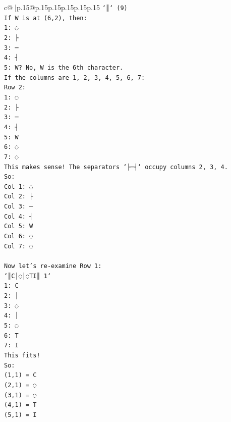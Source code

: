 \documentclass{article}
\begin{document}
{\begin{supertabular}{c@{$\;$}|p{.15\linewidth}@{}p{.15\linewidth}p{.15\linewidth}p{.15\linewidth}p{.15\linewidth}p{.15\linewidth}}
{{{\texttt{`║` (9)} \\
\texttt{If W is at (6,2), then:} \\
\texttt{1: ◌} \\
\texttt{2: ├} \\
\texttt{3: ─} \\
\texttt{4: ┤} \\
\texttt{5: W? No, W is the 6th character.} \\
\texttt{If the columns are 1, 2, 3, 4, 5, 6, 7:} \\
\texttt{Row 2:} \\
\texttt{1: ◌} \\
\texttt{2: ├} \\
\texttt{3: ─} \\
\texttt{4: ┤} \\
\texttt{5: W} \\
\texttt{6: ◌} \\
\texttt{7: ◌} \\
\texttt{This makes sense! The separators `├─┤` occupy columns 2, 3, 4.} \\
\texttt{So:} \\
\texttt{Col 1: ◌} \\
\texttt{Col 2: ├} \\
\texttt{Col 3: ─} \\
\texttt{Col 4: ┤} \\
\texttt{Col 5: W} \\
\texttt{Col 6: ◌} \\
\texttt{Col 7: ◌} \\
\\ 
\texttt{Now let's re{-}examine Row 1:} \\
\texttt{`║C│◌│◌TI║ 1`} \\
\texttt{1: C} \\
\texttt{2: │} \\
\texttt{3: ◌} \\
\texttt{4: │} \\
\texttt{5: ◌} \\
\texttt{6: T} \\
\texttt{7: I} \\
\texttt{This fits!} \\
\texttt{So:} \\
\texttt{(1,1) = C} \\
\texttt{(2,1) = ◌} \\
\texttt{(3,1) = ◌} \\
\texttt{(4,1) = T} \\
\texttt{(5,1) = I} \\
}}}
\end{supertabular}}
\end{document}
